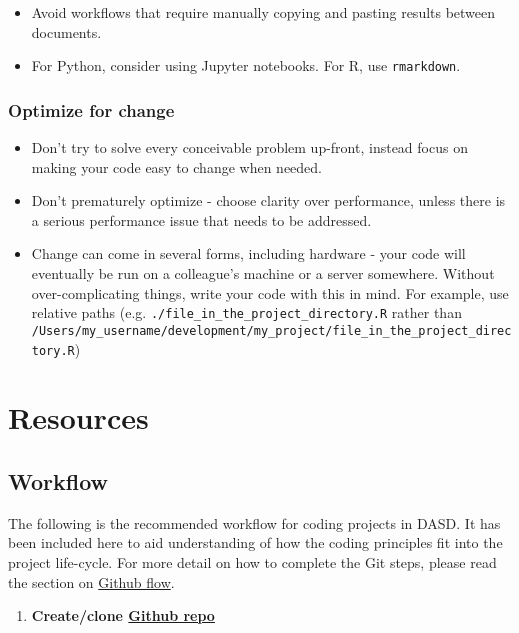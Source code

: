 \documentclass[]{book}
\providecommand{\tightlist}{%
  \setlength{\itemsep}{0pt}\setlength{\parskip}{0pt}}
\begin{document}
\begin{itemize}
\tightlist
\item
  Avoid workflows that require manually copying and pasting results between documents.\\
\item
  For Python, consider using Jupyter notebooks. For R, use \texttt{rmarkdown}.
\end{itemize}

\hypertarget{change}{%
\section{Optimize for change}\label{change}}

\begin{itemize}
\tightlist
\item
  Don't try to solve every conceivable problem up-front, instead focus on making your code easy to change when needed.
\item
  Don't prematurely optimize - choose clarity over performance, unless there is a serious performance issue that needs to be addressed.
\item
  Change can come in several forms, including hardware - your code will eventually be run on a colleague's machine or a server somewhere. Without over-complicating things, write your code with this in mind. For example, use relative paths (e.g. \texttt{./file\_in\_the\_project\_directory.R} rather than \texttt{/Users/my\_username/development/my\_project/file\_in\_the\_project\_directory.R})
\end{itemize}

\hypertarget{resources}{%
\part{Resources}\label{resources}}

\hypertarget{wf}{%
\chapter{Workflow}\label{wf}}

The following is the recommended workflow for coding projects in DASD. It has been included here to aid understanding of how the coding principles fit into the project life-cycle. For more detail on how to complete the Git steps, please read the section on \protect\hyperlink{flow}{Github flow}.

\begin{enumerate}
\def\labelenumi{\arabic{enumi}.}
\tightlist
\item
  \textbf{Create/clone \protect\hyperlink{versioncontrol}{Github repo}}\\
\end{enumerate}
\end{document}
